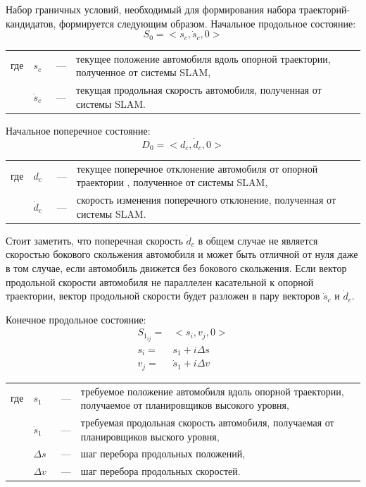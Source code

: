 Набор граничных условий, необходимый для формирования набора траекторий-кандидатов, формируется следующим образом.
Начальное продольное состояние:
\begin{equation}
      S_0 = <s_c, \dot{s}_c, 0>
\end{equation}
\noindent\begin{tabularx}{\linewidth}{lllX}
      где & $s_c$       &~---& текущее положение автомобиля вдоль опорной траектории, полученное от системы SLAM, \\
          & $\dot{s}_c$ &~---& текущая продольная скорость автомобиля, полученная от системы SLAM.
\end{tabularx}

Начальное поперечное состояние:
\begin{equation}
      D_0 = <d_c, \dot{d}_c, 0>
\end{equation}
\noindent\begin{tabularx}{\linewidth}{lllX}
      где & $d_c$       &~---& текущее поперечное отклонение автомобиля от опорной траектории , полученное от системы SLAM, \\
          & $\dot{d}_c$ &~---& скорость изменения поперечного отклонение, полученная от системы SLAM.
\end{tabularx}

Стоит заметить, что поперечная скорость $\dot{d}_c$ в общем случае не является скоростью бокового скольжения автомобиля
и может быть отличной от нуля даже в том случае, если автомобиль движется без бокового скольжения. Если вектор
продольной скорости автомобиля не параллелен касательной к опорной траектории, вектор продольной скорости будет разложен
в пару векторов $\dot{s}_c$ и $\dot{d}_c$.

Конечное продольное состояние:
\begin{equation}
      \begin{aligned}
            S_{1_{ij}} =& <s_i, v_j, 0> \\
            s_i =& s_1 + i\Delta s \\
            v_j =& \dot{s}_1 + i\Delta v
      \end{aligned}
\end{equation}
\noindent\begin{tabularx}{\linewidth}{lllX}
      где & $s_1$       &~---& требуемое положение автомобиля вдоль опорной траектории, получаемое от планировщиков высокого уровня, \\
          & $\dot{s}_1$ &~---& требуемая продольная скорость автомобиля, получаемая от планировщиков выского уровня, \\
          & $\Delta s$  &~---& шаг перебора продольных положений, \\
          & $\Delta v$  &~---& шаг перебора продольных скоростей.
\end{tabularx}


